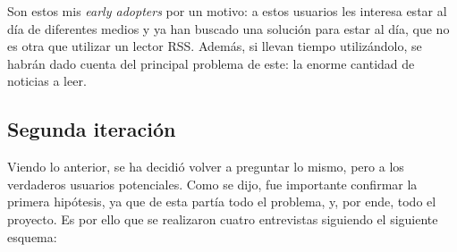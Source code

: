 Son estos mis \textit{early adopters} por un motivo: a estos usuarios les interesa estar al día de diferentes medios y ya han buscado una solución para estar al día, que no es otra que utilizar un lector RSS. Además, si llevan tiempo utilizándolo, se habrán dado cuenta del principal problema de este: la enorme cantidad de noticias a leer.


\subsection{Segunda iteración}

Viendo lo anterior, se ha decidió volver a preguntar lo mismo, pero a los verdaderos usuarios potenciales. Como se dijo, fue importante confirmar la primera hipótesis, ya que de esta partía todo el problema, y, por ende, todo el proyecto. Es por ello que se realizaron cuatro entrevistas siguiendo el siguiente esquema:

